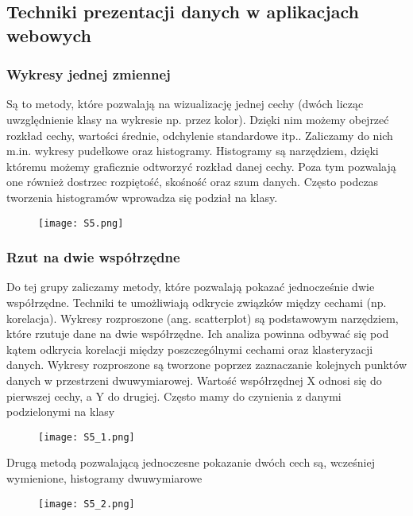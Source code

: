 \subsection{Techniki prezentacji danych w aplikacjach webowych}

\subsubsection{Wykresy jednej zmiennej}

Są to metody, które pozwalają na wizualizację jednej cechy (dwóch licząc uwzględnienie klasy na wykresie np. przez kolor). Dzięki nim możemy obejrzeć rozkład cechy, wartości średnie, odchylenie standardowe itp.. Zaliczamy do nich m.in. wykresy pudełkowe oraz histogramy. Histogramy są narzędziem, dzięki któremu możemy graficznie odtworzyć rozkład danej cechy. Poza tym pozwalają one również dostrzec rozpiętość, skośność oraz szum danych. Często podczas tworzenia histogramów wprowadza się podział na klasy.

\begin{figure}[H]
	\centering
	\texttt{[image: S5.png]}
\end{figure}

\subsubsection{Rzut na dwie współrzędne}

Do tej grupy zaliczamy metody, które pozwalają pokazać jednocześnie dwie współrzędne. Techniki te umożliwiają odkrycie związków między cechami (np. korelacja). Wykresy rozproszone (ang. scatterplot) są podstawowym narzędziem, które rzutuje dane na dwie współrzędne. Ich analiza powinna odbywać się pod kątem odkrycia korelacji między poszczególnymi cechami oraz klasteryzacji danych. Wykresy rozproszone są tworzone poprzez zaznaczanie kolejnych punktów danych w przestrzeni dwuwymiarowej. Wartość współrzędnej X odnosi się do pierwszej cechy, a Y do drugiej. Często mamy do czynienia z danymi podzielonymi na klasy

\begin{figure}[H]
	\centering
	\texttt{[image: S5\_1.png]}
\end{figure}

Drugą metodą pozwalającą jednoczesne pokazanie dwóch cech są, wcześniej wymienione, histogramy dwuwymiarowe

\begin{figure}[H]
	\centering
	\texttt{[image: S5\_2.png]}
\end{figure}

